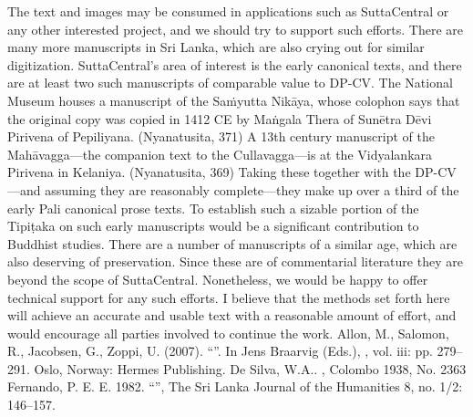 {}The text and images may be consumed in applications such as SuttaCentral or any other interested project, and we should try to support such efforts.\markdownRendererInterblockSeparator
{}There are many more manuscripts in Sri Lanka, which are also crying out for similar digitization. SuttaCentral’s area of interest is the early canonical texts, and there are at least two such manuscripts of comparable value to DP-CV.\markdownRendererInterblockSeparator
{}\markdownRendererUlBegin
\markdownRendererUlItem The National Museum houses a manuscript of the Saṁyutta Nikāya, whose colophon says that the original copy was copied in 1412 CE by Maṅgala Thera of Sunētra Dēvi Pirivena of Pepiliyana. (Nyanatusita, 371)\markdownRendererUlItemEnd 
\markdownRendererUlItem A 13th century manuscript of the Mahāvagga—the companion text to the Culla­vagga—is at the Vidyalankara Pirivena in Kelaniya. (Nyanatusita, 369)\markdownRendererUlItemEnd 
\markdownRendererUlEnd \markdownRendererInterblockSeparator
{}Taking these together with the DP-CV—and assuming they are reasonably complete—they make up over a third of the early Pali canonical prose texts. To establish such a sizable portion of the Tipiṭaka on such early manuscripts would be a significant contribution to Buddhist studies.\markdownRendererInterblockSeparator
{}There are a number of manuscripts of a similar age, which are also deserving of preservation. Since these are of commentarial literature they are beyond the scope of SuttaCentral. Nonetheless, we would be happy to offer technical support for any such efforts.\markdownRendererInterblockSeparator
{}I believe that the methods set forth here will achieve an accurate and usable text with a reasonable amount of effort, and would encourage all parties involved to continue the work.\markdownRendererInterblockSeparator
{}\markdownRendererInterblockSeparator
{}\markdownRendererUlBeginTight
\markdownRendererUlItem Allon, M., Salomon, R., Jacobsen, G., Zoppi, U. (2007). “”. In Jens Braarvig (Eds.), , vol. iii: pp. 279–291. Oslo, Norway: Hermes Publishing.\markdownRendererUlItemEnd 
\markdownRendererUlItem De Silva, W.A.. , Colombo 1938, No. 2363\markdownRendererUlItemEnd 
\markdownRendererUlItem Fernando, P. E. E. 1982. “”, The Sri Lanka Journal of the Humanities 8, no. 1/2: 146–157.\markdownRendererUlItemEnd 
